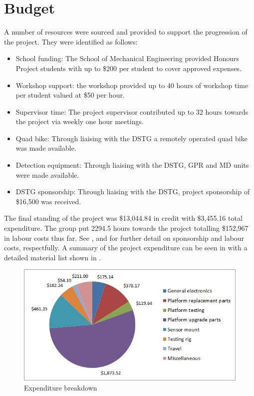 \documentclass[main.tex]{subfiles}
\begin{document}
\section{Budget}
A number of resources were sourced and provided to support the progression of the project. They were identified as follows:
\begin{itemize}
\item School funding: The School of Mechanical Engineering provided Honours Project students with up to \$200 per student to cover approved expenses.
\item Workshop support: the workshop provided up to 40 hours of workshop time per student valued at \$50 per hour.
\item Supervisor time: The project supervisor contributed up to 32 hours towards the project via weekly one hour meetings.
\item Quad bike: Through liaising with the DSTG a remotely operated quad bike was made available.
\item Detection equipment: Through liaising with the DSTG, GPR and MD units were made available.
\item DSTG sponsorship: Through liaising with the DSTG, project sponsorship of \$16,500 was received. 
\end{itemize}
The final standing of the project was \$13,044.84 in credit with \$3,455.16 total expenditure. The group put 2294.5 hours towards the project totalling \$152,967 in labour costs thus far. See , and  for further detail on sponsorship and labour costs, respectfully. A summary of the project expenditure can be seen in  with a detailed material list shown in .
\begin{figure}[ht]
\centering
\includegraphics[]{6-ProjectManagement/expenditurebreakdown.png}
\caption[]{Expenditure breakdown}
\end{figure}
\end{document}
